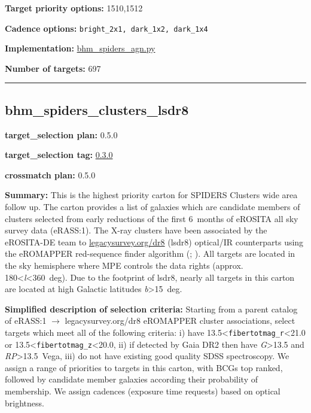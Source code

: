 \noindent\textbf{Target priority options:} 1510,1512

\noindent\textbf{Cadence options:} \texttt{bright\_2x1,\ dark\_1x2,\ dark\_1x4}

\noindent\textbf{Implementation:}
\href{https://github.com/sdss/target_selection/blob/0.3.0/python/target_selection/cartons/bhm_spiders_agn.py}{bhm\_spiders\_agn.py}

\noindent\textbf{Number of targets:} 697

\begin{center}\rule{0.5\linewidth}{0.5pt}\end{center}

\hypertarget{bhm_spiders_clusters_lsdr8_plan0.5.0}{%
\subsection{bhm\_spiders\_clusters\_lsdr8}\label{bhm_spiders_clusters_lsdr8_plan0.5.0}}

\noindent\textbf{target\_selection plan:} 0.5.0

\noindent\textbf{target\_selection tag:}
\href{https://github.com/sdss/target_selection/tree/0.3.0/}{0.3.0}

\noindent\textbf{crossmatch plan:} 0.5.0

\noindent\textbf{Summary:} This is the highest priority carton for SPIDERS
Clusters wide area follow up. The carton provides a list of galaxies
which are candidate members of clusters selected from early reductions
of the first 6~months of eROSITA all sky survey data (eRASS:1). The
X-ray clusters have been associated by the eROSITA-DE team to
\href{https://www.legacysurvey.org/dr8/}{legacysurvey.org/dr8} (lsdr8)
optical/IR counterparts using the eROMAPPER red-sequence finder
algorithm
(\citealt{Rykoff2014};
\citealt{IderChitham2020}). All targets are located in the sky hemisphere
where MPE controls the data rights (approx.
180\textless{}\emph{l}\textless360~deg). Due to the footprint of lsdr8,
nearly all targets in this carton are located at high Galactic latitudes
\textbar{}\emph{b}\textbar\textgreater15~deg.

\noindent\textbf{Simplified description of selection criteria:} Starting from a
parent catalog of eRASS:1 $\rightarrow$ legacysurvey.org/dr8 eROMAPPER cluster
associations, select targets which meet all of the following criteria:
i) have 13.5\textless{}\texttt{fibertotmag\_r}\textless21.0 or
13.5\textless{}\texttt{fibertotmag\_z}\textless20.0, ii) if detected by
Gaia DR2 then have \emph{G}\textgreater13.5 and
\emph{RP}\textgreater13.5~Vega, iii) do not have existing good quality
SDSS spectroscopy. We assign a range of priorities to targets in this
carton, with BCGs top ranked, followed by candidate member galaxies
according their probability of membership. We assign cadences (exposure
time requests) based on optical brightness.


